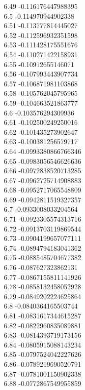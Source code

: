 {6.49	-0.116176447988395\\
6.5	-0.114970944902338\\
6.51	-0.113777814445027\\
6.52	-0.112596932351598\\
6.53	-0.111428175551676\\
6.54	-0.110271422158931\\
6.55	-0.10912655146071\\
6.56	-0.107993443907734\\
6.57	-0.106871981103868\\
6.58	-0.105762045795965\\
6.59	-0.104663521863777\\
6.6	-0.103576294309936\\
6.61	-0.102500249250016\\
6.62	-0.101435273902647\\
6.63	-0.100381256579717\\
6.64	-0.0993380866766346\\
6.65	-0.0983056546626636\\
6.66	-0.0972838520713285\\
6.67	-0.0962725714908883\\
6.68	-0.0952717065548809\\
6.69	-0.0942811519327357\\
6.7	-0.0933008033204564\\
6.71	-0.0923305574313716\\
6.72	-0.0913703119869544\\
6.73	-0.0904199657077111\\
6.74	-0.0894794183041362\\
6.75	-0.0885485704677382\\
6.76	-0.087627323862131\\
6.77	-0.0867155811141926\\
6.78	-0.0858132458052928\\
6.79	-0.0849202224625864\\
6.8	-0.0840364165503744\\
6.81	-0.0831617344615287\\
6.82	-0.0822960835089881\\
6.83	-0.0814393719173156\\
6.84	-0.0805915088143234\\
6.85	-0.0797524042227626\\
6.86	-0.0789219690520791\\
6.87	-0.0781001150902338\\
6.88	-0.0772867549955859\\
}
